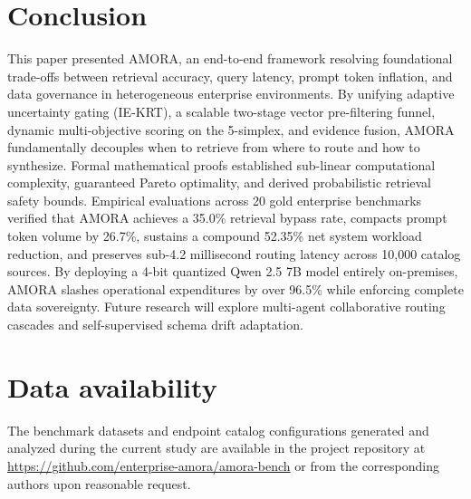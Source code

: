 \documentclass[fleqn,10pt]{article}
\begin{document}
\section{Conclusion}
This paper presented AMORA, an end-to-end framework resolving foundational trade-offs between retrieval accuracy, query latency, prompt token inflation, and data governance in heterogeneous enterprise environments. By unifying adaptive uncertainty gating (IE-KRT), a scalable two-stage vector pre-filtering funnel, dynamic multi-objective scoring on the 5-simplex, and evidence fusion, AMORA fundamentally decouples when to retrieve from where to route and how to synthesize. Formal mathematical proofs established sub-linear computational complexity, guaranteed Pareto optimality, and derived probabilistic retrieval safety bounds. Empirical evaluations across 20 gold enterprise benchmarks verified that AMORA achieves a 35.0\% retrieval bypass rate, compacts prompt token volume by 26.7\%, sustains a compound 52.35\% net system workload reduction, and preserves sub-4.2 millisecond routing latency across 10,000 catalog sources. By deploying a 4-bit quantized Qwen 2.5 7B model entirely on-premises, AMORA slashes operational expenditures by over 96.5\% while enforcing complete data sovereignty. Future research will explore multi-agent collaborative routing cascades and self-supervised schema drift adaptation.

\section*{Data availability}
The benchmark datasets and endpoint catalog configurations generated and analyzed during the current study are available in the project repository at \href{https://github.com/enterprise-amora/amora-bench}{https://github.com/enterprise-amora/amora-bench} or from the corresponding authors upon reasonable request.
\end{document}
